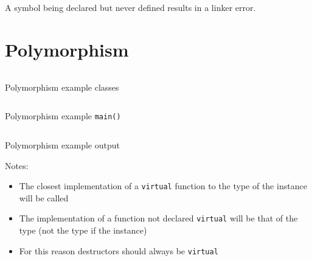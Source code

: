 \documentclass[a4paper]{article}
\begin{document}
A symbol being declared but never defined results in a linker error.

\section{Polymorphism}

\begin{listing}[h!]
  \inputminted[linenos,frame=lines,firstline=5,lastline=31]{cpp}{listings/polymorphism_1.cpp}
  \caption{Polymorphism example classes}
  \label{listing:polymorphism_1}
\end{listing}
\FloatBarrier

\begin{listing}[h!]
  \inputminted[linenos,frame=lines,firstline=33]{cpp}{listings/polymorphism_1.cpp}
  \caption{Polymorphism example \texttt{main()}}
  \label{listing:polymorphism_1_main}
\end{listing}
\FloatBarrier

\begin{listing}[h!]
  \inputminted[linenos,frame=lines]{text}{out/polymorphism_1.txt}
  \caption{Polymorphism example output}
  \label{listing:polymorphism_1_out}
\end{listing}
\FloatBarrier

Notes:

\begin{itemize}
  \item The closest implementation of a \texttt{virtual} function to the type of
        the instance will be called
  \item The implementation of a function not declared \texttt{virtual} will be
        that of the type (not the type if the instance)
  \item For this reason destructors should always be \texttt{virtual}
\end{itemize}
\end{document}
